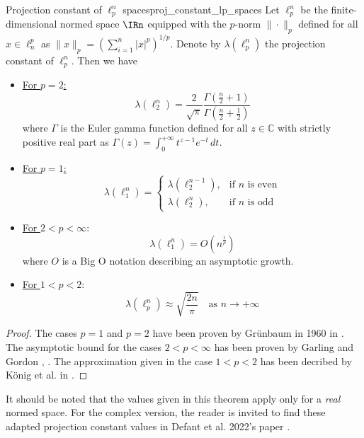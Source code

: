\begin{theorembox}{Projection constant of $\ell_p^n$ spaces}{proj_constant_lp_spaces}
    Let $\ell_p^n$ be the finite-dimensional normed space $\IRn$ equipped with the $p$-norm $\|\cdot\|_p$ defined for all $x\in \ell_n^p$ as $\|x\|_p=\left(\sum_{i=1}^n \vert x\vert^p\right)^{1/p}$. Denote by $\lambda(\ell_p^n)$ the projection constant of $\ell_p^n$. Then we have

    \vspace{5mm}

    \begin{itemize}
        \item {\underline{For $p=2$:}
        $$\lambda(\ell_2^n) = \frac{2}{\sqrt{\pi}}\frac{\Gamma(\frac{n}{2} + 1)}{\Gamma(\frac{n}{2} + \frac{1}{2})}$$
    where $\Gamma$ is the Euler gamma function defined for all $z\in \mathbb{C}$ with strictly positive real part as $\Gamma(z)=\int_0^{+\infty}t^{z-1}e^{-t}\,dt$.}
        \item{\vspace{5mm}\underline{For $p=1$:}
    $$\lambda(\ell_1^n) = \begin{cases} 
        \lambda(\ell_2^{n-1}), & \text{if $n$ is even} \\
        \lambda(\ell_2^n), & \text{if $n$ is odd}
     \end{cases}$$
        }
        \item{
            \vspace{5mm}
            \underline{For $2<p<\infty$}:
            $$\lambda(\ell_1^n) = O(n^{\frac{1}{p}})$$
            where $O$ is a Big O notation describing an asymptotic growth.
        }
        \item{
            \vspace{5mm}
            \underline{For $1<p<2$}:
            $$\lambda(\ell_p^n) \approx \sqrt{\frac{2n}{\pi}}\quad \text{as $n\rightarrow +\infty$}$$
        }
    \end{itemize}
\end{theorembox}
\begin{proof}
    The cases $p=1$ and $p=2$ have been proven by Grünbaum in 1960 in \cite{grunbaumProjectionConstants1960}.
    The asymptotic bound for the cases $2<p<\infty$ has been proven by Garling and Gordon \cite{gordonProjectionMacphailConstants1968}, \cite{garlingRelationsConstantsAssociated1971}.
    The approximation given in the case $1<p<2$ has been decribed by König et al. in \cite{konigProjectionConstantsSymmetric1999}.
\end{proof}
It should be noted that the values given in this theorem apply only for a \emph{real} normed space. For the complex version, the reader is invited to find these adapted projection constant values in Defant et al. 2022's paper \cite{defantProjectionConstantsSpaces2022}.


